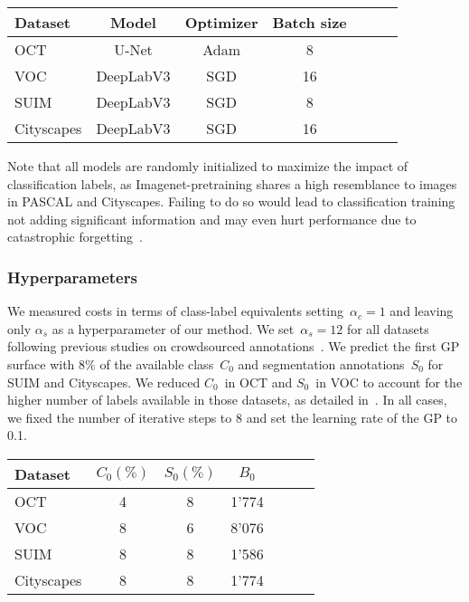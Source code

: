 \begin{table}
\centering
\begin{tabular}{lcccccc}
\toprule
\textbf{Dataset} & \textbf{Model} &  \textbf{Optimizer} & \textbf{Batch size} \\ \midrule
OCT & U-Net &  Adam & 8  \\
VOC & DeepLabV3 &  SGD & 16 \\
SUIM & DeepLabV3 &  SGD & 8  \\ 
Cityscapes & DeepLabV3 & SGD & 16   \\ \bottomrule
\end{tabular}
\end{table}

Note that all models are randomly initialized to maximize the impact of classification labels, as Imagenet-pretraining shares a high resemblance to images in PASCAL and Cityscapes. Failing to do so would lead to classification training not adding significant information and may even hurt performance due to catastrophic forgetting~.

\subsubsection{Hyperparameters}
We measured costs in terms of class-label equivalents setting~$\alpha_c=1$ and leaving only $\alpha_s$ as a hyperparameter of our method. We set~$\alpha_s=12$ for all datasets following previous studies on crowdsourced annotations~. We predict the first GP surface with $8\%$ of the available class~$C_0$ and segmentation annotations~$S_0$ for SUIM and Cityscapes. We reduced $C_0$~in OCT and $S_0$~in VOC to account for the higher number of labels available in those datasets, as detailed in~. In all cases, we fixed the number of iterative steps to 8 and set the learning rate of the GP to 0.1.

\begin{table}[h]
\centering
\begin{tabular}{lcccccc}
\toprule
\textbf{Dataset} & $C_0 (\%)$ & $S_0 (\%)$ & $B_0$ \\ \midrule
OCT & 4 & 8 & 1'774 \\
VOC & 8 & 6 & 8'076 \\
SUIM & 8 & 8 & 1'586 \\ 
Cityscapes & 8 & 8 & 1'774  \\ \bottomrule
\end{tabular}
\end{table}

